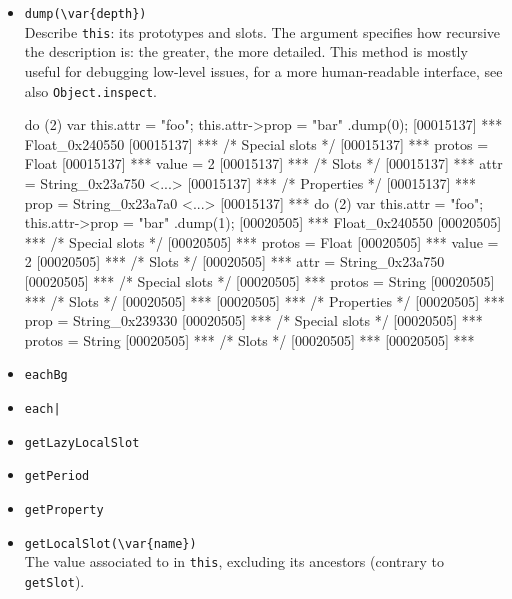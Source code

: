 \begin{itemize}
\item \lstinline|dump(\var{depth})|\\
  Describe \lstinline|this|: its prototypes and slots.  The argument
   specifies how recursive the description is: the greater,
  the more detailed.  This method is mostly useful for debugging
  low-level issues, for a more human-readable interface, see also
  \lstinline|Object.inspect|.
\begin{urbiscript}[firstnumber=last]
do (2) { var this.attr = "foo"; this.attr->prop = "bar" }.dump(0);
[00015137] *** Float_0x240550 {
[00015137] ***   /* Special slots */
[00015137] ***   protos = Float
[00015137] ***   value = 2
[00015137] ***   /* Slots */
[00015137] ***   attr = String_0x23a750 <...>
[00015137] ***     /* Properties */
[00015137] ***     prop = String_0x23a7a0 <...>
[00015137] ***   }
do (2) { var this.attr = "foo"; this.attr->prop = "bar" }.dump(1);
[00020505] *** Float_0x240550 {
[00020505] ***   /* Special slots */
[00020505] ***   protos = Float
[00020505] ***   value = 2
[00020505] ***   /* Slots */
[00020505] ***   attr = String_0x23a750 {
[00020505] ***     /* Special slots */
[00020505] ***     protos = String
[00020505] ***     /* Slots */
[00020505] ***     }
[00020505] ***     /* Properties */
[00020505] ***     prop = String_0x239330 {
[00020505] ***       /* Special slots */
[00020505] ***       protos = String
[00020505] ***       /* Slots */
[00020505] ***       }
[00020505] ***   }
\end{urbiscript}

\item \lstinline|eachBg|\\

\item \lstinline$each|$\\

\item \lstinline|getLazyLocalSlot|\\

\item \lstinline|getPeriod|\\

\item \lstinline|getProperty|\\

\item \lstinline|getLocalSlot(\var{name})|\\
  The value associated to  in \lstinline|this|, excluding
  its ancestors (contrary to \lstinline|getSlot|).


\end{itemize}
